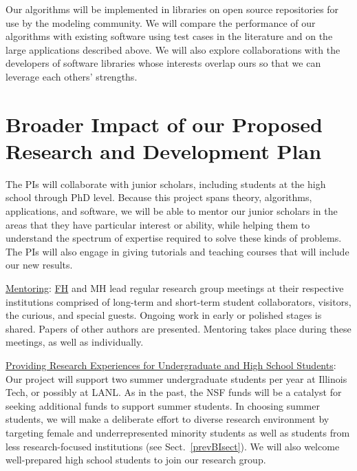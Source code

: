 \documentclass[11pt]{NSFamsart}
\newcommand{\Upara}[1]{\noindent\underline{\upshape #1}:}
\newcommand{\FH}{\hyperlink{FHlink}{FH}\xspace}
\begin{document}
Our algorithms will be implemented in libraries on open source repositories for use by the modeling community. We will compare the performance of our algorithms with existing software using test cases in the literature and on the large applications described above. We will also explore collaborations with the developers of software libraries whose interests overlap ours so that we can leverage each others' strengths.


\section{Broader Impact of our Proposed Research and Development Plan}

The PIs will collaborate with junior scholars, including students at the high school through PhD level. Because this project spans theory, algorithms, applications, and software, we will be able to mentor our junior scholars in the areas that they have particular interest or ability, while helping them to understand the spectrum of expertise required to solve these kinds of problems. The PIs will also engage in giving tutorials and teaching courses that will include our new results.

\Upara{Mentoring}
\FH and MH lead regular research group meetings at their respective institutions comprised of long-term and short-term student collaborators, visitors, the curious, and special guests. Ongoing work in early or polished stages is shared. Papers of other authors are presented. Mentoring takes place during these meetings, as well as individually.

\Upara{Providing Research Experiences for Undergraduate and High School Students} 
Our project will support two summer undergraduate students per year at Illinois Tech, or possibly at LANL. As in the past, the NSF funds will be a catalyst for seeking additional funds to support summer students. In choosing summer students, we will make a deliberate effort to diverse research environment by targeting female and underrepresented minority students as well as students from less research-focused institutions (see Sect.~\ref{prevBIsect}). We will also welcome well-prepared high school students to join our research group.
\end{document}
